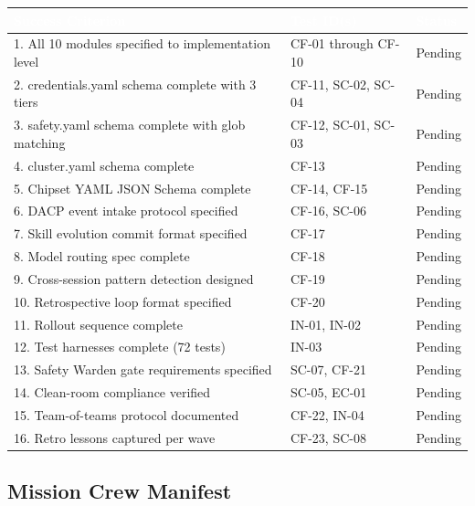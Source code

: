 \documentclass[11pt,letterpaper]{article}
\newcommand{\tableheader}[1]{\textbf{\sffamily\textcolor{white}{#1}}}
\begin{document}
\begin{center}
\begin{tabularx}{\textwidth}{XL{4cm}C{1.5cm}}
\toprule
{}
\tableheader{Success Criterion} & \tableheader{Test ID(s)} & \tableheader{Status} \\
. All 10 modules specified to implementation level & CF-01 through CF-10 & Pending \\
2. credentials.yaml schema complete with 3 tiers & CF-11, SC-02, SC-04 & Pending \\
3. safety.yaml schema complete with glob matching & CF-12, SC-01, SC-03 & Pending \\
4. cluster.yaml schema complete & CF-13 & Pending \\
5. Chipset YAML JSON Schema complete & CF-14, CF-15 & Pending \\
6. DACP event intake protocol specified & CF-16, SC-06 & Pending \\
7. Skill evolution commit format specified & CF-17 & Pending \\
8. Model routing spec complete & CF-18 & Pending \\
9. Cross-session pattern detection designed & CF-19 & Pending \\
10. Retrospective loop format specified & CF-20 & Pending \\
11. Rollout sequence complete & IN-01, IN-02 & Pending \\
12. Test harnesses complete (72 tests) & IN-03 & Pending \\
13. Safety Warden gate requirements specified & SC-07, CF-21 & Pending \\
14. Clean-room compliance verified & SC-05, EC-01 & Pending \\
15. Team-of-teams protocol documented & CF-22, IN-04 & Pending \\
16. Retro lessons captured per wave & CF-23, SC-08 & Pending \\
\end{tabularx}
\end{center}

\subsection{Mission Crew Manifest}
\end{document}

